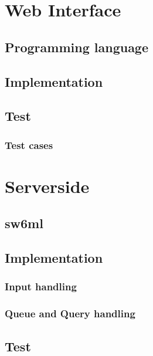   \section{Web Interface}
    \label{sect:webInterface}
    
      \subsection{Programming language}
        
      \subsection{Implementation}
        
      \subsection{Test}
        
      \subsubsection{Test cases}
        

  \section{Serverside} %
    
      \label{sect:ssArchAndDesign}
	
      \subsection{sw6ml} %
	\label{sw6ml}
        
	  
    \subsection{Implementation}
      
      \subsubsection{Input handling} %
        
      \subsubsection{Queue and Query handling} %
	\label{QQHandling}
	
    \subsection{Test}
      
